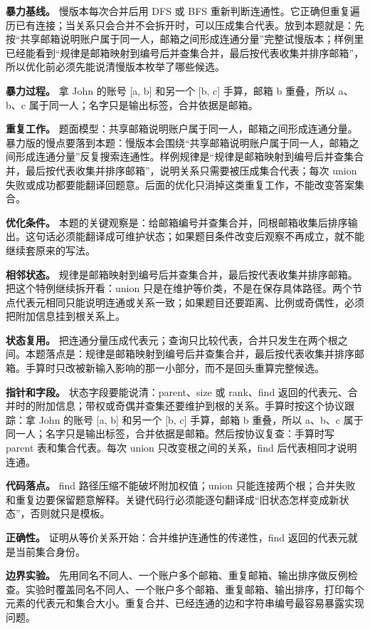 \textbf{暴力基线。} 慢版本每次合并后用 DFS 或 BFS 重新判断连通性。它正确但重复遍历已有连接；当关系只会合并不会拆开时，可以压成集合代表。放到本题就是：先按“共享邮箱说明账户属于同一人，邮箱之间形成连通分量”完整试慢版本；样例里已经能看到“规律是邮箱映射到编号后并查集合并，最后按代表收集并排序邮箱”，所以优化前必须先能说清慢版本枚举了哪些候选。

\textbf{暴力过程。} 拿 John 的账号 [a, b] 和另一个 [b, c] 手算，邮箱 b 重叠，所以 a、b、c 属于同一人；名字只是输出标签，合并依据是邮箱。

\textbf{重复工作。} 题面模型：共享邮箱说明账户属于同一人，邮箱之间形成连通分量。暴力版的慢点要落到本题：慢版本会围绕“共享邮箱说明账户属于同一人，邮箱之间形成连通分量”反复搜索连通性。样例规律是“规律是邮箱映射到编号后并查集合并，最后按代表收集并排序邮箱”，说明关系只需要被压成集合代表；每次 union 失败或成功都要能翻译回题意。后面的优化只消掉这类重复工作，不能改变答案集合。

\textbf{优化条件。} 本题的关键观察是：给邮箱编号并查集合并，同根邮箱收集后排序输出。这句话必须能翻译成可维护状态；如果题目条件改变后观察不再成立，就不能继续套原来的写法。

\textbf{相邻状态。} 规律是邮箱映射到编号后并查集合并，最后按代表收集并排序邮箱。把这个特例继续拆开看：union 只是在维护等价类，不是在保存具体路径。两个节点代表元相同只能说明连通或关系一致；如果题目还要距离、比例或奇偶性，必须把附加信息挂到根关系上。

\textbf{状态复用。} 把连通分量压成代表元；查询只比较代表，合并只发生在两个根之间。本题落点是：规律是邮箱映射到编号后并查集合并，最后按代表收集并排序邮箱。手算时只改被新输入影响的那一小部分，而不是回头重算完整候选。

\textbf{指针和字段。} 状态字段要能说清：parent、size 或 rank、find 返回的代表元、合并时的附加信息；带权或奇偶并查集还要维护到根的关系。手算时按这个协议跟踪：拿 John 的账号 [a, b] 和另一个 [b, c] 手算，邮箱 b 重叠，所以 a、b、c 属于同一人；名字只是输出标签，合并依据是邮箱。然后按协议复查：手算时写 parent 表和集合代表。每次 union 只改变根之间的关系，find 后代表相同才说明连通。

\textbf{代码落点。} find 路径压缩不能破坏附加权值；union 只能连接两个根；合并失败和重复边要保留题意解释。关键代码行必须能逐句翻译成“旧状态怎样变成新状态”，否则就只是模板。

\textbf{正确性。} 证明从等价关系开始：合并维护连通性的传递性，find 返回的代表元就是当前集合身份。

\textbf{边界实验。} 先用同名不同人、一个账户多个邮箱、重复邮箱、输出排序做反例检查。实验时覆盖同名不同人、一个账户多个邮箱、重复邮箱、输出排序，打印每个元素的代表元和集合大小。重复合并、已经连通的边和字符串编号最容易暴露实现问题。

